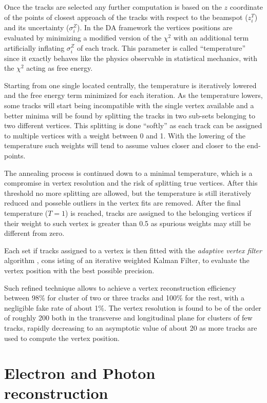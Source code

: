 Once the tracks are selected any further computation is based on the $z$ coordinate of the points of closest approach of the tracks with respect to the beamspot ($z_i^T$) and its uncertainty ($\sigma_i^Z$). In the DA framework the vertices positions are evaluated by minimizing a modified version of the $\chi^2$ with an additional term artificially inflating $\sigma_i^Z$ of each track. This parameter is called ``temperature'' since it exactly behaves like the physics observable in statistical mechanics, with the  $\chi^2$ acting as free energy.

Starting from one single located centrally, the temperature is iteratively lowered and the free energy term minimized for each iteration. As the temperature lowers, some tracks will start being incompatible with the single vertex available and a better minima will be found by splitting the tracks in two sub-sets belonging to two different vertices. This splitting is done ``softly'' as each track can be assigned to multiple vertices with a weight between 0 and 1. With the lowering of the temperature such weights will tend to assume values closer and closer to the end-points.

The annealing process is continued down to a minimal temperature, which is a compromise in vertex resolution and the risk of splitting true vertices. After this threshold no more splitting are allowed, but the temperature is still iteratively reduced and posseble outliers in the vertex fits are removed. After the final temperature ($T=1$) is reached, tracks are assigned to the belonging vertices if their weight to such vertex is greater than 0.5 as spurious weights may still be different from zero. 

Each set if tracks assigned to a vertex is then fitted with the \emph{adaptive vertex filter} algorithm \cite{CMS_NOTE_2007-008}, cons isting of an iterative weighted Kalman Filter, to evaluate the vertex position with the best possible precision.

Such refined technique allows to achieve a vertex reconstruction efficiency between 98\% for cluster  of two or three tracks and 100\% for the rest, with a negligible fake rate of about 1\%. The vertex resolution is found to be of the order of roughly 200 \um both in the transverse and longitudinal plane for clusters of few tracks, rapidly decreasing to an asymptotic value of about 20 \um as more tracks are used to compute the vertex position.

\section{Electron and Photon reconstruction}


